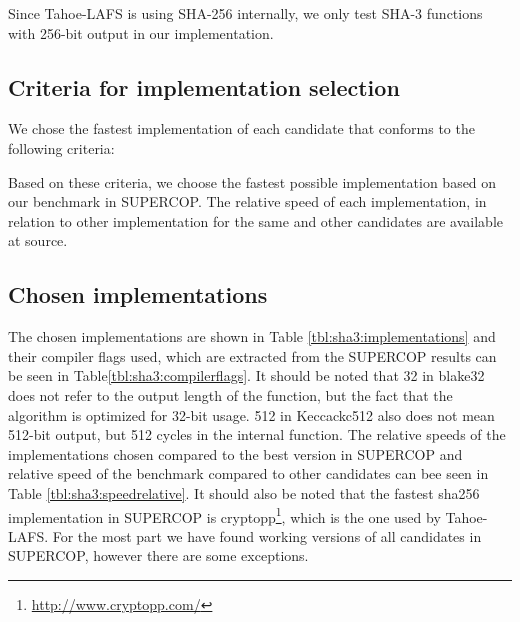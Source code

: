 \documentclass[english,12pt,a4paper]{book}
\begin{document}
Since Tahoe-\ac{LAFS} is using \ac{SHA}-256 internally, we only test \ac{SHA}-3
functions with 256-bit output in our implementation. 


\subsection{Criteria for implementation selection}

We chose the fastest implementation of each candidate that conforms to the
following criteria:

Based on these criteria, we choose the fastest possible implementation based
on our benchmark in \ac{SUPERCOP}. The relative speed of each implementation, in
relation to other implementation for the same and other candidates are
available at source.

\subsection{Chosen implementations}



The chosen implementations are shown in Table \ref{tbl:sha3:implementations}
and their compiler flags used, which are extracted from the \ac{SUPERCOP}
results can be seen in Table\ref{tbl:sha3:compilerflags}. It should be noted
that 32 in blake32 does not refer to the output length of the function, but the
fact that the algorithm is optimized for 32-bit usage. 512 in Keccackc512 also
does not mean 512-bit output, but 512 cycles in the internal function. The
relative speeds of the implementations chosen compared to the best version in
\ac{SUPERCOP} and relative speed of the benchmark compared to other candidates
can bee seen in Table \ref{tbl:sha3:speedrelative}. It should also be noted
that the fastest sha256 implementation in \ac{SUPERCOP} is
cryptopp\footnote{\url{http://www.cryptopp.com/}}, which is the one used by
Tahoe-\ac{LAFS}. For the most part we have found working versions of all
candidates in \ac{SUPERCOP}, however there are some exceptions. 
\end{document}
